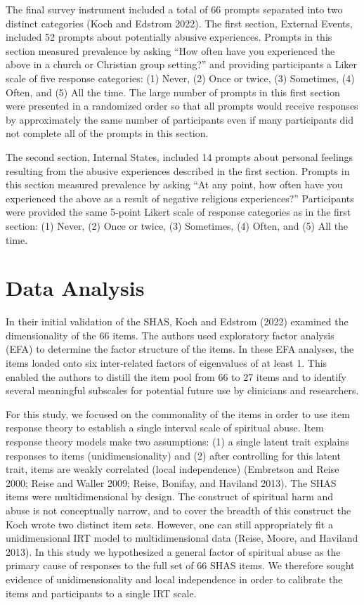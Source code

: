 \documentclass[
  letterpaper,
  DIV=11,
  numbers=noendperiod]{scrreport}
\begin{document}
The final survey instrument included a total of 66 prompts separated
into two distinct categories (Koch and Edstrom 2022). The first section,
External Events, included 52 prompts about potentially abusive
experiences. Prompts in this section measured prevalence by asking ``How
often have you experienced the above in a church or Christian group
setting?'' and providing participants a Liker scale of five response
categories: (1) Never, (2) Once or twice, (3) Sometimes, (4) Often, and
(5) All the time. The large number of prompts in this first section were
presented in a randomized order so that all prompts would receive
responses by approximately the same number of participants even if many
participants did not complete all of the prompts in this section.

The second section, Internal States, included 14 prompts about personal
feelings resulting from the abusive experiences described in the first
section. Prompts in this section measured prevalence by asking ``At any
point, how often have you experienced the above as a result of negative
religious experiences?'' Participants were provided the same 5-point
Likert scale of response categories as in the first section: (1) Never,
(2) Once or twice, (3) Sometimes, (4) Often, and (5) All the time.

\hypertarget{data-analysis}{%
\section*{Data Analysis}\label{data-analysis}}

In their initial validation of the SHAS, Koch and Edstrom (2022)
examined the dimensionality of the 66 items. The authors used
exploratory factor analysis (EFA) to determine the factor structure of
the items. In these EFA analyses, the items loaded onto six
inter-related factors of eigenvalues of at least 1. This enabled the
authors to distill the item pool from 66 to 27 items and to identify
several meaningful subscales for potential future use by clinicians and
researchers.

For this study, we focused on the commonality of the items in order to
use item response theory to establish a single interval scale of
spiritual abuse. Item response theory models make two assumptions: (1) a
single latent trait explains responses to items (unidimensionality) and
(2) after controlling for this latent trait, items are weakly correlated
(local independence) (Embretson and Reise 2000; Reise and Waller 2009;
Reise, Bonifay, and Haviland 2013). The SHAS items were multidimensional
by design. The construct of spiritual harm and abuse is not conceptually
narrow, and to cover the breadth of this construct the Koch wrote two
distinct item sets. However, one can still appropriately fit a
unidimensional IRT model to multidimensional data (Reise, Moore, and
Haviland 2013). In this study we hypothesized a general factor of
spiritual abuse as the primary cause of responses to the full set of 66
SHAS items. We therefore sought evidence of unidimensionality and local
independence in order to calibrate the items and participants to a
single IRT scale.
\end{document}
